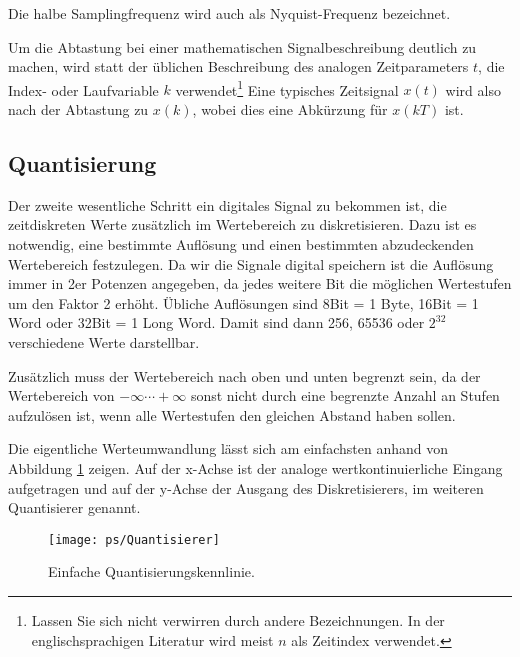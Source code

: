 
Die halbe Samplingfrequenz wird auch als Nyquist-Frequenz bezeichnet.

Um die Abtastung bei einer mathematischen Signalbeschreibung deutlich zu machen, wird
statt der üblichen Beschreibung des analogen  Zeitparameters $t$, die
Index- oder Laufvariable $k$ verwendet\footnote{Lassen Sie sich
nicht verwirren durch andere Bezeichnungen. In der englischsprachigen Literatur wird meist
$n$ als Zeitindex verwendet.}
Eine typisches Zeitsignal $x(t)$ wird also nach der Abtastung zu $x(k)$, wobei
dies eine Abkürzung für $x(kT)$ ist.

\subsection{Quantisierung\label{sec:Quantisierung}}

Der zweite wesentliche Schritt ein digitales Signal zu bekommen ist, die zeitdiskreten Werte
zusätzlich im Wertebereich zu diskretisieren.
Dazu ist es notwendig, eine bestimmte Auflösung und einen bestimmten abzudeckenden Wertebereich festzulegen.
Da wir die Signale digital speichern ist die Auflösung immer in 2er Potenzen angegeben, da
jedes weitere Bit die möglichen Wertestufen um den Faktor 2 erhöht.
Übliche Auflösungen sind 8Bit = 1 Byte, 16Bit = 1 Word oder 32Bit = 1 Long Word.
Damit sind dann 256, 65536 oder $2^{32}$ verschiedene Werte darstellbar.

Zusätzlich muss der Wertebereich nach oben und unten begrenzt sein, da der Wertebereich
von $-\infty  \cdots +\infty$ sonst nicht durch eine begrenzte Anzahl an Stufen aufzulösen ist,
wenn alle Wertestufen den gleichen Abstand haben sollen.

Die eigentliche Werteumwandlung lässt sich am einfachsten anhand von Abbildung
\ref{pic:Quantisierer} zeigen. Auf der x-Achse ist der analoge wertkontinuierliche Eingang
aufgetragen und auf der y-Achse der Ausgang des Diskretisierers, im weiteren Quantisierer
genannt.
\begin{figure}[H]
\begin{center}
\texttt{[image: ps/Quantisierer]}
\caption{\label{pic:Quantisierer} Einfache Quantisierungskennlinie.}
\end{center}
\end{figure}


